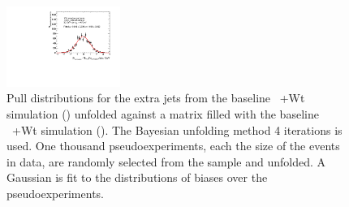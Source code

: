 \begin{figure}
\includegraphics[width=0.33\textwidth]{fig/UnfoldPull/SingleSlicePull31.pdf}
%
\caption{Pull distributions for the extra jets from the baseline \ttbar\ +Wt simulation (\powpy) unfolded against a matrix filled with the baseline \ttbar\ +Wt simulation (\powpy). The Bayesian unfolding method 4 iterations is used. One thousand pseudoexperiments, each the size of the events in data, are randomly selected from the sample and unfolded.  A Gaussian is fit to the distributions of biases over the pseudoexperiments.}
\label{fig:appPull1}
\end{figure}
